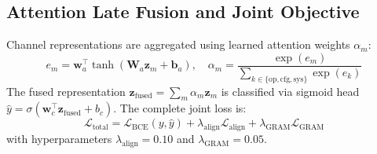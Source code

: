 \documentclass[pdflatex,sn-mathphys-num]{sn-jnl}
\begin{document}
\subsection{Attention Late Fusion and Joint Objective}\label{sec:math_fusion}
Channel representations are aggregated using learned attention weights $\alpha_m$:
\begin{equation}
e_m = \mathbf{w}_a^\top \tanh\left(\mathbf{W}_a \mathbf{z}_m + \mathbf{b}_a\right), \quad \alpha_m = \frac{\exp(e_m)}{\sum_{k \in \{\text{op}, \text{cfg}, \text{sys}\}} \exp(e_k)}
\end{equation}
The fused representation $\mathbf{z}_{\text{fused}} = \sum_{m} \alpha_m \mathbf{z}_m$ is classified via sigmoid head $\hat{y} = \sigma(\mathbf{w}_c^\top \mathbf{z}_{\text{fused}} + b_c)$. The complete joint loss is:
\begin{equation}
\mathcal{L}_{\text{total}} = \mathcal{L}_{\text{BCE}}(y, \hat{y}) + \lambda_{\text{align}} \mathcal{L}_{\text{align}} + \lambda_{\text{GRAM}} \mathcal{L}_{\text{GRAM}}
\end{equation}
with hyperparameters $\lambda_{\text{align}} = 0.10$ and $\lambda_{\text{GRAM}} = 0.05$.
\end{document}
